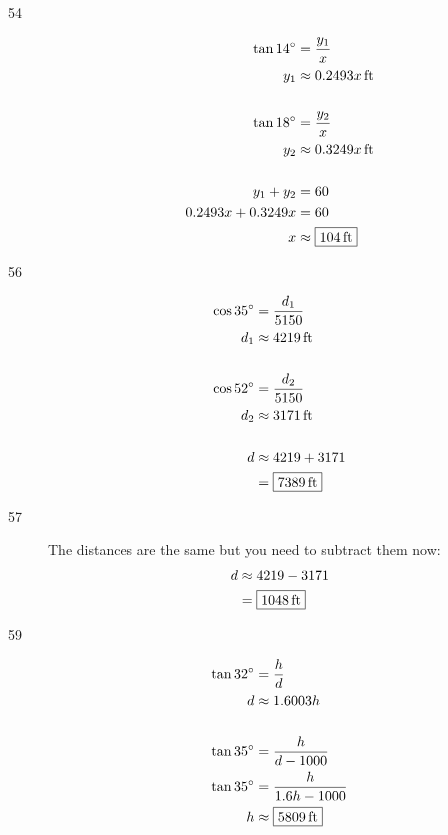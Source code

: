 \documentclass{exam}
\newcommand{\dg}{\ensuremath{^\circ}}
\begin{document}
\begin{description}
      \item[54]
        \begin{align*}
          \tan 14 \dg & = \frac{y_1}{x} \\
          y_1         & \approx \unit[0.2493 x]{ft} \\
          \\
          \tan 18 \dg & = \frac{y_2}{x} \\
          y_2         & \approx \unit[0.3249 x]{ft} \\
          \\
          y_1 + y_2           & = 60 \\
          0.2493 x + 0.3249 x & = 60 \\
          x                   & \approx \boxed{ \unit[104]{ft} } \\
        \end{align*}

      \item[56]
        \begin{align*}
          \cos 35 \dg & = \frac{d_1}{5150} \\
          d_1         & \approx \unit[4219]{ft} \\
          \\
          \cos 52 \dg & = \frac{d_2}{5150} \\
          d_2         & \approx \unit[3171]{ft} \\
          \\
          d & \approx 4219 + 3171 \\
            & = \boxed{ \unit[7389]{ft} } \\
        \end{align*}

      \item[57]
        The distances are the same but you need to subtract them now:
        \begin{align*}
          d & \approx 4219 - 3171 \\
            & = \boxed{ \unit[1048]{ft} } \\
        \end{align*}

      \item[59]
        \begin{align*}
            \tan 32 \dg & = \frac{h}{d} \\
            d           & \approx 1.6003 h \\
            \\
            \tan 35 \dg & = \frac{h}{d - 1000} \\
            \tan 35 \dg & = \frac{h}{1.6h - 1000} \\
            h           & \approx \boxed{ \unit[5809]{ft} } \\
        \end{align*}


\end{description}
\end{document}
